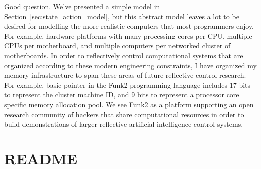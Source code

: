 Good question.  We've presented a simple model in
Section~\ref{sec:state_action_model}, but this abstract model leaves a
lot to be desired for modelling the more realistic computers that most
programmers enjoy.  For example, hardware platforms with many
processing cores per CPU, multiple CPUs per motherboard, and multiple
computers per networked cluster of motherboards.  In order to
reflectively control computational systems that are organized
according to these modern engineering constraints, I have organized my
memory infrastructure to span these areas of future reflective control
research.  For example, basic pointer in the Funk2 programming
language includes 17 bits to represent the cluster machine ID, and 9
bits to represent a processor core specific memory allocation pool.
We see Funk2 as a platform supporting an open research community of
hackers that share computational resources in order to build
demonstrations of larger reflective artificial intelligence control
systems.


\section{README}

